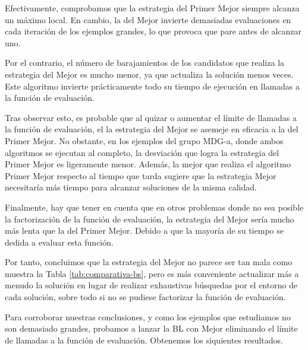 \documentclass{article}
\begin{document}
Efectivamente, comprobamos que la estrategia del Primer Mejor siempre alcanza un máximo local. En cambio, la del Mejor
invierte demasiadas evaluaciones en cada iteración de los ejemplos grandes, lo que provoca que pare antes de alcanzar uno.

Por el contrario, el número de barajamientos de los candidatos que realiza la estrategia del Mejor es mucho menor, ya que
actualiza la solución menos veces. Este algoritmo invierte prácticamente todo su tiempo de ejecución en llamadas a la función
de evaluación.

Tras observar esto, es probable que al quizar o aumentar el límite de llamadas a la función de evaluación, el la estrategia del 
Mejor se asemeje en eficacia a la del Primer Mejor. No obstante, en los ejemplos del grupo MDG-a, donde ambos algoritmos se
 ejecutan al completo, la desviación que logra
la estrategia del Primer Mejor es ligeramente menor. Además, la mejor que realiza el algoritmo Primer Mejor respecto al tiempo que
tarda sugiere que la estrategia Mejor necesitaría más tiempo para alcanzar soluciones de la misma calidad.

Finalmente, hay que tener en cuenta que en otros problemas donde no sea posible la factorización de la función de evaluación,
la estrategia del Mejor sería mucho más lenta que la del Primer Mejor. Debido a que la mayoría de su tiempo se dedida a evaluar
esta función.

Por tanto, concluimos que la estrategia del Mejor no parece ser tan mala como muestra la Tabla \ref{tab:comparativa-bs}, pero
es más conveniente actualizar más a menudo la solución en lugar de realizar exhaustivas búsquedas por el entorno de cada solución,
sobre todo si no se pudiese factorizar la función de evaluación.

Para corroborar nuestras conclusiones, y como los ejemplos que estudiamos no son demasiado grandes, probamos a lanzar la BL
con Mejor eliminando el límite de llamadas a la función de evaluación. Obtenemos los siquientes resultados.
\end{document}
